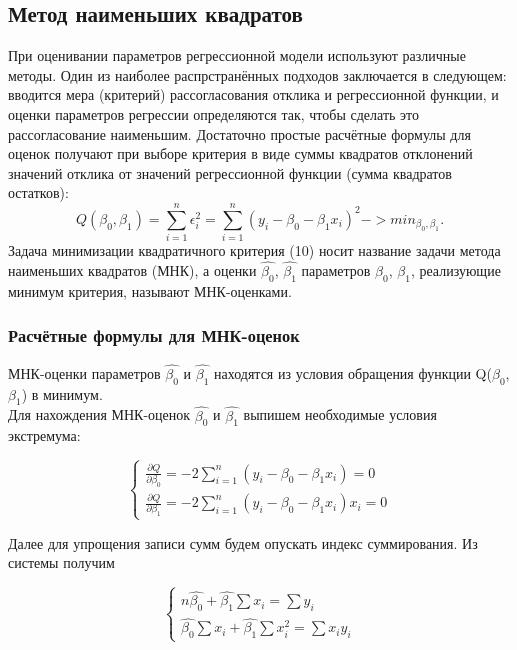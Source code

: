 \documentclass[a4]{article}
\begin{document}
		\subsection{Метод наименьших квадратов}
			При оценивании параметров регрессионной модели используют различные методы. Один из наиболее распрстранённых подходов заключается в следующем: вводится мера (критерий) рассогласования отклика и регрессионной функции, и оценки параметров регрессии определяются так, чтобы сделать это рассогласование наименьшим. Достаточно простые расчётные формулы для оценок получают при выборе критерия в виде суммы квадратов отклонений значений отклика от значений регрессионной функции (сумма квадратов остатков):
			$$Q(\beta_0, \beta_1) = \sum_{i = 1}^{n} \epsilon^2_i = \sum_{i = 1}^{n} (y_i - \beta_0 - \beta_1 x_i)^2 -> min_{\beta_0, \beta_1} .$$
			Задача минимизации квадратичного критерия (10) носит название задачи метода наименьших квадратов (МНК), а оценки $\hat{\beta_0}$, $\hat{\beta_1}$ параметров $\beta_0$, $\beta_1$, реализующие минимум критерия, называют МНК-оценками.
		\subsubsection{Расчётные формулы для МНК-оценок}
			МНК-оценки параметров $\hat{\beta_0}$ и $\hat{\beta_1}$ находятся из условия обращения функции Q($\beta_0$, $\beta_1$) в минимум.\\	
			Для нахождения МНК-оценок $\hat{\beta_0}$ и $\hat{\beta_1}$ выпишем необходимые условия экстремума:

			
			\begin{equation*} 
			\begin{cases}
			\frac{\partial Q}{\partial \beta_0} = -2 \sum_{i = 1}^{n} (y_i - \beta_0 - \beta_1 x_i) = 0\\
			\frac{\partial Q}{\partial \beta_1} = -2 \sum_{i = 1}^{n} (y_i - \beta_0 - \beta_1 x_i)x_i = 0
			\end{cases}
			\end{equation*}
			
			Далее для упрощения записи сумм будем опускать индекс суммирования. Из системы получим
			
			\begin{equation*} 
			\begin{cases}
			n\hat{\beta_0} + \hat{\beta_1} \sum x_i = \sum y_i\\
			\hat{\beta_0}\sum x_i + \hat{\beta_1} \sum x^2_i = \sum x_i y_i
			\end{cases}
			\end{equation*}
			
\end{document}
